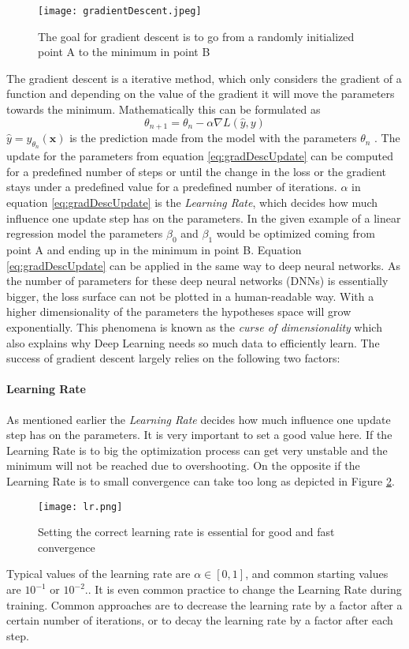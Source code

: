 \begin{figure}
\centering
  \texttt{[image: gradientDescent.jpeg]}
  \caption{The goal for gradient descent is to go from a randomly initialized point A to the minimum in point B \cite{gradDescent}
}\label{fig:gradientDescent}
\end{figure}
The gradient descent is a iterative method, which only considers the gradient of a function and depending on the value of the gradient it will move the parameters towards the minimum.
Mathematically this can be formulated as 
\begin{equation}\label{eq:gradDescUpdate}
\theta_{n+1} = \theta_n - \alpha \nabla L(\hat{y}, y)
\end{equation}
$\hat{y} = y_{\theta_n}(\mathbf{x})$ is the prediction made from the model with the parameters $\theta_n$ \cite{ValdenegroToro2019DeepNN}.
The update for the parameters from equation \ref{eq:gradDescUpdate} can be computed for a predefined number of steps or until the change in the loss or the gradient stays under a predefined value for a predefined number of iterations.
$\alpha$ in equation \ref{eq:gradDescUpdate} is the \emph{Learning Rate}, which decides how much influence one update step has on the parameters.
In the given example of a linear regression model the parameters 
$\beta_0$ and $\beta_1$ would be optimized coming from point A and ending up in the minimum in point B.
Equation \ref{eq:gradDescUpdate} can be applied in the same way to deep neural networks. As the number of parameters for these deep neural networks (DNNs) is essentially bigger, the loss surface can not be plotted in a human-readable way. 
With a higher dimensionality of the parameters the hypotheses space will grow exponentially. This phenomena is known as the \emph{curse of dimensionality} which also explains why Deep Learning needs so much data to efficiently learn.
The success of gradient descent largely relies on the following two factors:
\paragraph{Learning Rate}
As mentioned earlier the \emph{Learning Rate} decides how much influence one update step has on the parameters. 
It is very important to set a good value here. If the Learning Rate is to big the optimization process can get very unstable and the minimum will not be reached due to overshooting. 
On the opposite if the Learning Rate is to small convergence can take too long as depicted in Figure \ref{fig:lr}.
\begin{figure}
\centering
  \texttt{[image: lr.png]}
  \caption{Setting the correct learning rate is essential for good and fast convergence \cite{lr}
}\label{fig:lr}
\end{figure}
Typical values of the learning rate are $\alpha \in [0,1]$, and common starting values are $10^{-1}$ or  $10^{-2}$.\cite{ValdenegroToro2019DeepNN}. 
It is even common practice to change the Learning Rate during training. 
Common approaches are to
decrease the learning rate by a factor after a certain number of
iterations, or to decay the learning rate by a factor after each step. \cite{ValdenegroToro2019DeepNN}
